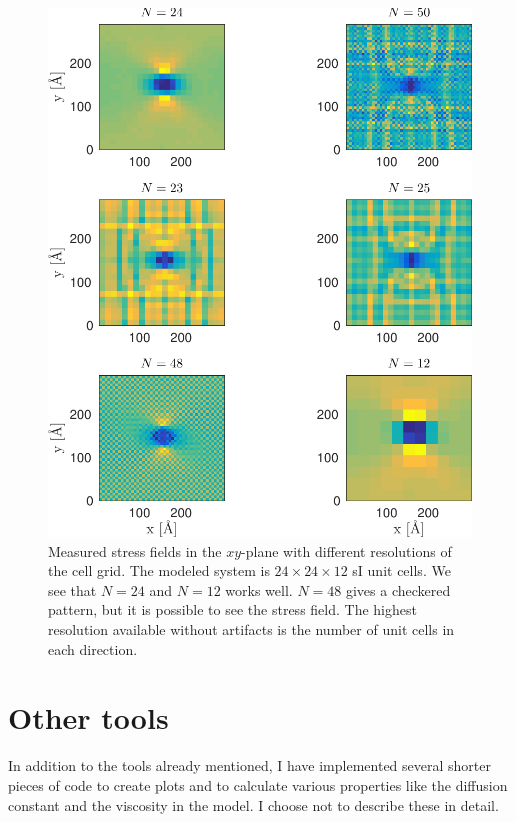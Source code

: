 \begin{figure}
\includegraphics[width=\textwidth]{../figures/thesis/stressfield_artefacts.pdf}
\caption{Measured stress fields in the $xy$-plane with different resolutions of the cell grid. The modeled system is $24\times 24\times 12$ sI unit cells. We see that $N=24$ and $N=12$ works well. $N=48$ gives a checkered pattern, but it is possible to see the stress field. The highest resolution available without artifacts is the number of unit cells in each direction.}
\label{fig:artefacts}
\end{figure}

\section{Other tools}
In addition to the tools already mentioned, I have implemented several shorter pieces of code to create plots and to calculate various properties like the diffusion constant and the viscosity in the model. I choose not to describe these in detail.